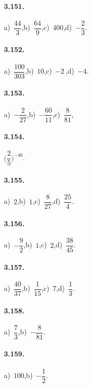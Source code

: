 \begin{multicols}{2}
\paragraph{3.151.}
a)~$\dfrac{44}{3}$,\quad b)~$\dfrac{64}{9}$,\quad c)~$400$,\quad d)~$-\dfrac{2}{3}$.

\paragraph{3.152.}
a)~$\dfrac{100}{303}$,\quad b)~$10$,\quad c)~$-2~$,\quad d)~$-4$.

\paragraph{3.153.}
a)~$-\dfrac{2}{27}$,\quad b)~$-\dfrac{60}{11}$,\quad c)~$\dfrac{8}{81}$,\quad %

\paragraph{3.154.}
$\bigg(\dfrac{2}{5}\bigg)^{-46}$.

\paragraph{3.155.}
a)~$2$,\quad b)~$1$,\quad c)~$\dfrac{8}{27}$,\quad d)~$\dfrac{25}{4}$.

\paragraph{3.156.}
a)~$-\dfrac{9}{2}$,\quad b)~$1$,\quad c)~$2$,\quad d)~$\dfrac{38}{45}$.

\paragraph{3.157.}
a)~$\dfrac{40}{37}$,\quad b)~$\dfrac{1}{15}$,\quad c)~$7$,\quad d)~$\dfrac{1}{3}$.

\paragraph{3.158.}
a)~$\dfrac{7}{3}$,\quad b)~$-\dfrac{8}{81}$.

\paragraph{3.159.}
a)~$100$,\quad b)~$-\dfrac{1}{2}$.
\end{multicols}

